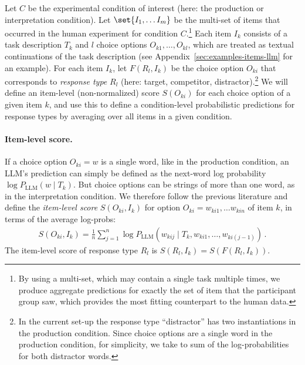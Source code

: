 \documentclass{article}
\begin{document}
Let $C$ be the experimental condition of interest (here: the production or interpretation condition).
Let \(\set{I_1, \dots I_m}\) be the multi-set of items that occurred in the human experiment for condition $C$.\footnote{
  By using a multi-set, which may contain a single task multiple times, we produce aggregate predictions for exactly the set of item that the participant group saw, which provides the most fitting counterpart to the human data.
}
Each item $I_{k}$ consists of a task description $T_{k}$ and $l$ choice options $O_{k1}, \dots, O_{kl}$, which are treated as textual continuations of the task description (see Appendix~\ref{sec:examples-items-llm} for an example).
For each item $I_{k}$, let $F(R_{l}, I_{k})$ be the choice option $O_{ki}$ that corresponds to \emph{response type} $R_{l}$ (here: target, competitor, distractor).\footnote{In the current set-up the response type ``distractor'' has two instantiations in the production condition. Since choice options are a single word in the production condition, for simplicity, we take to sum of the log-probabilities for both distractor words.}
We will define an item-level (non-normalized) score $S(O_{ki})$ for each choice option of a given item $k$, and use this to define a condition-level probabilistic predictions for response types by averaging over all items in a given condition.

\paragraph{Item-level score.}
If a choice option $O_{ki} = w$ is a single word, like in the production condition, an LLM's prediction can simply be defined as the next-word log probability $\log P_{\text{LLM}} (w \mid T_{k})$.
But choice options can be strings of more than one word, as in the interpretation condition.
We therefore follow the previous literature \citep[e.g.,][]{BrownMann2020:Language-Models} and define the \emph{item-level score} $S(O_{{ki}}, I_{k})$ for option $O_{ki} = w_{ki1}, \dots w_{kin}$ of item $k$, in terms of the average log-probs:
%
\begin{align*}
S(O_{ki}, I_{k}) =  \frac{1}{n} \sum_{j=1}^n \log P_{\text{LLM}} \left(w_{kij} \mid T_{k}, w_{ki1}, \dots, w_{ki(j-1)} \right)  \,.
\end{align*}
%
The item-level score of response type $R_{l}$ is $S(R_{l}, I_{k}) = S(F(R_{l}, I_{k}))$.
\end{document}
